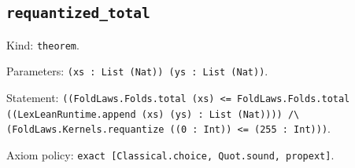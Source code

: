 \documentclass[11pt]{article}
\begin{document}
\subsection*{\texttt{requantized\_total}}
\noindent Kind: \texttt{theorem}.\par
\noindent Parameters: \texttt{(xs : List (Nat)) (ys : List (Nat))}.\par
\noindent Statement: \texttt{((FoldLaws.Folds.total (xs) <= FoldLaws.Folds.total ((LexLeanRuntime.append (xs) (ys) : List (Nat)))) /\textbackslash{} (FoldLaws.Kernels.requantize ((0 : Int)) <= (255 : Int)))}.\par
\noindent Axiom policy: \texttt{exact [Classical.choice, Quot.sound, propext]}.\par
\end{document}
